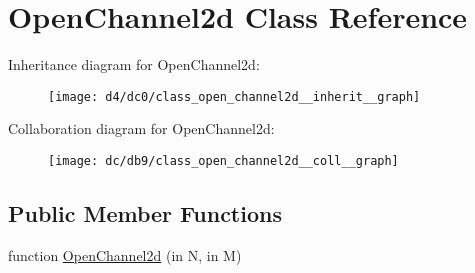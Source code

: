 \hypertarget{class_open_channel2d}{}\section{Open\+Channel2d Class Reference}
\label{class_open_channel2d}


Inheritance diagram for Open\+Channel2d\+:
\nopagebreak
\begin{figure}[H]
\begin{center}
\leavevmode
\texttt{[image: d4/dc0/class\_open\_channel2d\_\_inherit\_\_graph]}
\end{center}
\end{figure}


Collaboration diagram for Open\+Channel2d\+:
\nopagebreak
\begin{figure}[H]
\begin{center}
\leavevmode
\texttt{[image: dc/db9/class\_open\_channel2d\_\_coll\_\_graph]}
\end{center}
\end{figure}
\subsection*{Public Member Functions}
\begin{DoxyCompactItemize}
\item 
function \hyperlink{class_open_channel2d_ac068d0d6e1b6a0fe28b87e7bb04f0467}{Open\+Channel2d} (in N, in M)
\end{DoxyCompactItemize}
